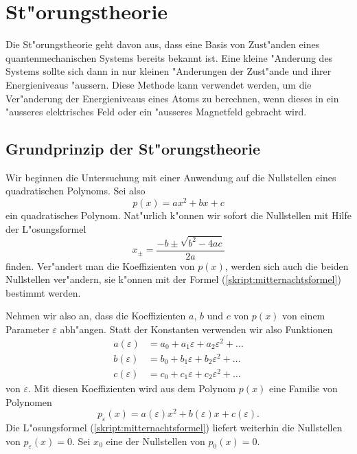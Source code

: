 \chapter{St"orungstheorie\label{chapter:stoerungstheorie}}
\rhead{}
Die St"orungstheorie geht davon aus, dass eine Basis von Zust"anden eines
quantenmechanischen Systems bereits bekannt ist. Eine kleine
"Anderung des Systems sollte sich dann in nur kleinen "Anderungen
der Zust"ande und ihrer Energieniveaus "aussern.
Diese Methode kann verwendet werden, um die Ver"anderung der Energieniveaus
eines Atoms zu berechnen, wenn dieses in ein "ausseres elektrisches Feld
oder ein "ausseres Magnetfeld gebracht wird.

\section{Grundprinzip der St"orungstheorie}
Wir beginnen die Untersuchung mit einer Anwendung auf die Nullstellen
eines quadratischen Polynoms. Sei also
\[
p(x) = ax^2 + bx + c
\]
ein quadratisches Polynom. Nat"urlich k"onnen wir sofort die Nullstellen
mit Hilfe der L"osungsformel
\begin{equation}
x_{\pm}=\frac{-b\pm\sqrt{b^2-4ac}}{2a}
\label{skript:mitternachtsformel}
\end{equation}
finden.  Ver"andert man die Koeffizienten von $p(x)$, werden sich auch
die beiden Nullstellen ver"andern, sie k"onnen mit der Formel
(\ref{skript:mitternachtsformel}) bestimmt werden.

Nehmen wir also an, dass die Koeffizienten $a$, $b$ und $c$ von $p(x)$
von einem Parameter $\varepsilon$ abh"angen. Statt der Konstanten verwenden
wir also Funktionen
\begin{align*}
a(\varepsilon)&=a_0+a_1\varepsilon+a_2\varepsilon^2+\dots\\
b(\varepsilon)&=b_0+b_1\varepsilon+b_2\varepsilon^2+\dots\\
c(\varepsilon)&=c_0+c_1\varepsilon+c_2\varepsilon^2+\dots
\end{align*}
von $\varepsilon$. Mit diesen Koeffizienten wird aus dem Polynom $p(x)$
eine Familie von Polynomen
\[
p_\varepsilon(x)=a(\varepsilon)x^2 + b(\varepsilon)x+c(\varepsilon).
\]
Die L"osungsformel (\ref{skript:mitternachtsformel}) liefert weiterhin die
Nullstellen von $p_{\varepsilon}(x)=0$.
Sei $x_0$ eine der Nullstellen von $p_0(x) = 0$.

